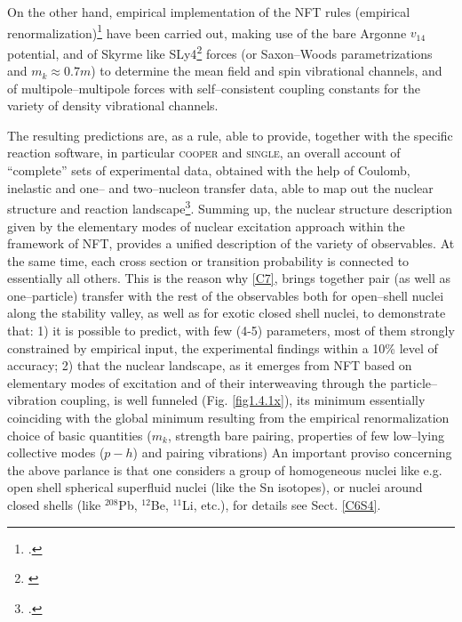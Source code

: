 On the other hand, empirical implementation of the NFT rules (empirical renormalization)\footnote{\cite{Broglia:16}.} have been carried out, making use of the bare Argonne $v_{14}$ potential, and of Skyrme like SLy4\footnote{\cite{Chabanat:97}} forces (or Saxon--Woods parametrizations and $m_k\approx0.7 m$) to determine the mean field and spin vibrational channels, and of multipole--multipole forces with self--consistent  coupling constants for the variety of density vibrational channels.


The resulting predictions are, as a rule, able to provide, together with the specific reaction software, in particular \textsc{cooper} and \textsc{single}, an overall account of ``complete'' sets of experimental data, obtained with the help of Coulomb, inelastic and one-- and two--nucleon transfer data, able to map out the nuclear structure and reaction landscape\footnote{\cite{Idini:15,Idini:14,Potel:13}.}. Summing up, the nuclear structure description given by the elementary modes of nuclear excitation approach within the framework of NFT, provides a unified description of the variety of observables. At the same time, each cross section or transition probability is connected to essentially all others. This is the reason why \ref{C7}, brings together pair (as well as one--particle) transfer with the rest of the observables both for open--shell nuclei along the stability valley, as well as for exotic closed shell nuclei, to demonstrate that: 1) it is possible to predict, with few (4-5) parameters, most of them strongly constrained by empirical input, the experimental findings within a 10\% level of accuracy; 2) that the nuclear landscape, as it emerges from NFT based on elementary modes of excitation and of their interweaving through the particle--vibration coupling, is well funneled (Fig. \ref{fig1.4.1x}), its minimum essentially coinciding with the global minimum resulting from the empirical renormalization choice of basic quantities ($m_k$, strength bare pairing, properties of few low--lying collective modes ($p-h$) and pairing vibrations) An important proviso concerning the above parlance is that one considers a group of homogeneous nuclei like e.g. open shell spherical superfluid nuclei (like the Sn isotopes), or nuclei around closed shells (like $^{208}$Pb, $^{12}$Be, $^{11}$Li, etc.), for details see Sect. \ref{C6S4}. 

